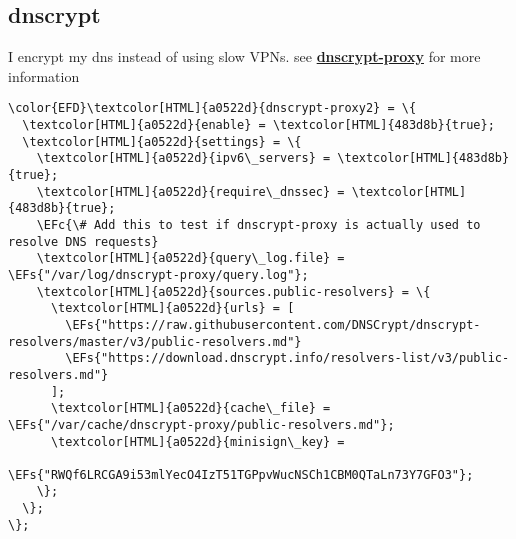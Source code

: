\documentclass[14pt]{article}
\let\oldhref\href
\renewcommand{\href}[2]{\oldhref{#1}{\textbf{#2}}}
\newcommand{\EFc}[1]{\textcolor{EFc}{#1}} %
\newcommand{\EFs}[1]{\textcolor{EFs}{#1}} %
\begin{document}
\subsection{dnscrypt}
\label{sec:orgce02689}
I encrypt my dns instead of using slow VPNs. see \href{https://github.com/DNSCrypt/dnscrypt-proxy/blob/master/dnscrypt-proxy/example-dnscrypt-proxy.toml}{dnscrypt-proxy} for more information
\begin{Code}
\begin{Verbatim}
\color{EFD}\textcolor[HTML]{a0522d}{dnscrypt-proxy2} = \{
  \textcolor[HTML]{a0522d}{enable} = \textcolor[HTML]{483d8b}{true};
  \textcolor[HTML]{a0522d}{settings} = \{
    \textcolor[HTML]{a0522d}{ipv6\_servers} = \textcolor[HTML]{483d8b}{true};
    \textcolor[HTML]{a0522d}{require\_dnssec} = \textcolor[HTML]{483d8b}{true};
    \EFc{\# Add this to test if dnscrypt-proxy is actually used to resolve DNS requests}
    \textcolor[HTML]{a0522d}{query\_log.file} = \EFs{"/var/log/dnscrypt-proxy/query.log"};
    \textcolor[HTML]{a0522d}{sources.public-resolvers} = \{
      \textcolor[HTML]{a0522d}{urls} = [
        \EFs{"https://raw.githubusercontent.com/DNSCrypt/dnscrypt-resolvers/master/v3/public-resolvers.md"}
        \EFs{"https://download.dnscrypt.info/resolvers-list/v3/public-resolvers.md"}
      ];
      \textcolor[HTML]{a0522d}{cache\_file} = \EFs{"/var/cache/dnscrypt-proxy/public-resolvers.md"};
      \textcolor[HTML]{a0522d}{minisign\_key} =
        \EFs{"RWQf6LRCGA9i53mlYecO4IzT51TGPpvWucNSCh1CBM0QTaLn73Y7GFO3"};
    \};
  \};
\};
\end{Verbatim}
\end{Code}
\end{document}
